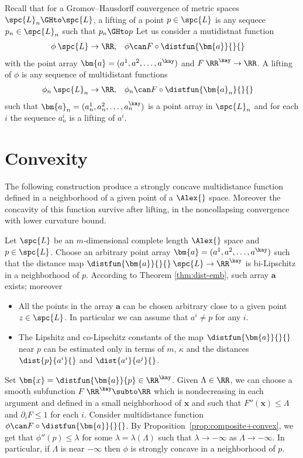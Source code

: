 Recall that for a Gromov--Hausdorff convergence of metric spaces
$\spc{L}_n\GHto\spc{L}$,
a lifting of a point $p\in \spc{L}$ is any sequece $p_n\in\spc{L}_n$ such that $p_n\GHto p$
Let us consider a mutidistnat function 
\begin{align*}
\phi&\:\spc{L}\to\RR,
&
\phi&\can F\circ\distfun{\bm{a}}{}{}
\end{align*}
with the point array $\bm{a}=(a^1,a^2,\dots,a^\kay)$ and $F\:\RR^\kay\to \RR$.
A lifting of $\phi$ is any sequence of multidistant 
functions 
 \begin{align*}
\phi_n
&\:\spc{L}_n\to\RR,
&
\phi_n
&\can F\circ\distfun{\bm{a}_n}{}{}
\end{align*}
such that $\bm{a}_n=(a_n^1,a_n^2,\dots,a_n^\kay)$
is a point array in $\spc{L}_n$
and for each $i$ the sequence $a_n^i$ is a lifting of $a^i$.



\section{Convexity}

The following construction produce 
a strongly concave multidistance function
defined in a neighborhood of a given point 
of a $\Alex{}$ space.
Moreover the concavity of this function survive 
after lifting, in the noncollapsing convergence 
with lower curvature bound.

Let $\spc{L}$ be an $m$-dimensional complete length $\Alex{}$ space and $p\in\spc{L}$.
Choose an arbitrary point array 
$\bm{a}=(a^1,a^2,\dots,a^\kay)$
such that the distance map $\distfun{\bm{a}}{}{}\:\spc{L}\to\RR^\kay$ is bi-Lipschitz in a neighborhood of $p$.
According to  Theorem \ref{thm:dist-emb},
such array $\bm{a}$ exists; 
moreover 
\begin{itemize}
\item All the points in the array $\bm{a}$ can be chosen arbitrary close to a given point $z\in \spc{L}$. In particular we can assume that $a^i\ne p$ for any $i$.
\item The Lipshitz and co-Lipschitz constants of the map $\distfun{\bm{a}}{}{}$ near $p$ can be estimated only in terms of $m$, $\kappa$ and the distances $\dist{p}{a^i}{}$ and $\dist{a^i}{a^j}{}$. 
\end{itemize}

Set $\bm{x}=\distfun{\bm{a}}{p}\in\RR^\kay$.
Given $\Lambda\in\RR$,
we can choose a smooth subfunction $F\:\RR^\kay\subto\RR$
which is nondecreasing in each argument
and defined in a small neighborhood of $\bm{x}$
and such that $F''(\bm{x})\le \Lambda$ and $\partial_iF\le 1$ for each $i$.
Consider multidistance function $\phi\can F\circ\distfun{\bm{a}}{}{}$.
By Proposition~\ref{prop:composite+convex},
we get that $\phi''(p)\le \lambda$
for some $\lambda=\lambda(\Lambda)$ such that
$\lambda\to-\infty$ as $\Lambda\to-\infty$.
In particular, if $\Lambda$ is near $-\infty$
then $\phi$ is strongly concave 
in a neighborhood of $p$.


